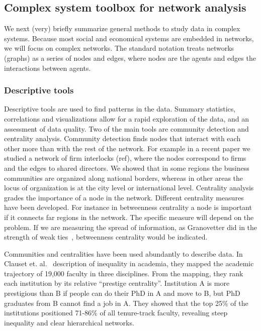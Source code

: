 \subsection{Complex system toolbox for network analysis}
We next (very) briefly summarize general methods to study data in complex systems.
Because most social and economical systems are embedded in networks, we will focus on complex networks. 
The standard notation treats networks (graphs) as a series of nodes and edges, where nodes are the agents and edges the interactions between agents.


\subsubsection{Descriptive tools}
Descriptive tools are used to find patterns in the data.
Summary statistics, correlations and visualizations allow for a rapid exploration of the data, and an assessment of data quality.
Two of the main tools are community detection and centrality analysis.
Community detection finds nodes that interact with each other more than with the rest of the network.
For example in a recent paper we studied a network of firm interlocks (ref), 
where the nodes correspond to firms and the edges to shared directors.
We showed that in some regions the business communities are organized along national borders, 
whereas in other areas the locus of organization is at the city level or international level. 
Centrality analysis grades the importance of a node in the network. 
Different centrality measures have been developed. 
For instance in betweenness centrality a node is important if it connects far regions in the network. 
The specific measure will depend on the problem. 
If we are measuring the spread of information, 
as Granovetter did in the strength of weak ties~\citep{Granovetter1973}, 
betweenness centrality would be indicated.


Communities and centralities have been used abundantly to describe data.
In Clauset et. al.~\citep{Clauset2015} description of inequality in academia, 
they mapped the academic trajectory of 19,000 faculty in three disciplines.
From the mapping, they rank each institution by its relative ``prestige centrality''.
Institution A is more prestigious than B if people can do their PhD in A and move to B, 
but PhD graduates from B cannot find a job in A.
They showed that the top 25\% of the institutions positioned 71-86\% of all tenure-track faculty,
revealing steep inequality and clear hierarchical networks.



